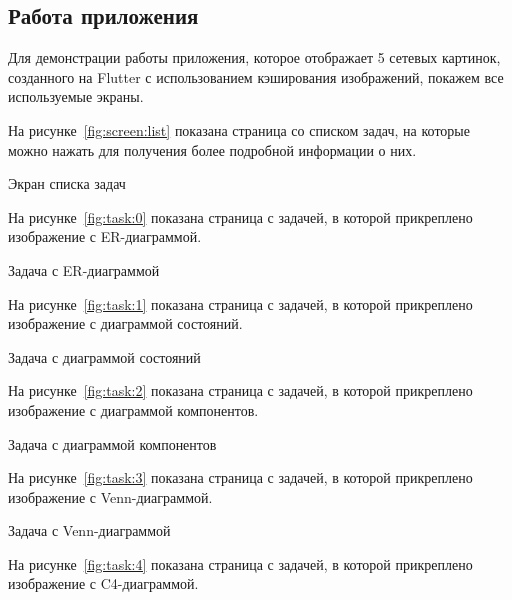 \subsection{Работа приложения}

Для демонстрации работы приложения,
которое отображает 5 сетевых картинок,
созданного на Flutter с использованием кэширования изображений,
покажем все используемые экраны.

На рисунке~\ref{fig:screen:list} показана страница со списком задач,
на которые можно нажать для получения более подробной информации о них.

\begin{image}
	\caption{Экран списка задач}
	\label{fig:screen:list}
\end{image}

На рисунке~\ref{fig:task:0} показана страница с задачей,
в которой прикреплено изображение с ER-диаграммой.

\begin{image}
	\caption{Задача с ER-диаграммой}
	\label{fig:task:0}
\end{image}

На рисунке~\ref{fig:task:1} показана страница с задачей,
в которой прикреплено изображение с диаграммой состояний.

\begin{image}
	\caption{Задача с диаграммой состояний}
	\label{fig:task:1}
\end{image}

На рисунке~\ref{fig:task:2} показана страница с задачей,
в которой прикреплено изображение с диаграммой компонентов.

\begin{image}
	\caption{Задача с диаграммой компонентов}
	\label{fig:task:2}
\end{image}

На рисунке~\ref{fig:task:3} показана страница с задачей,
в которой прикреплено изображение с Venn-диаграммой.

\begin{image}
	\caption{Задача с Venn-диаграммой}
	\label{fig:task:3}
\end{image}

На рисунке~\ref{fig:task:4} показана страница с задачей,
в которой прикреплено изображение с C4-диаграммой.

